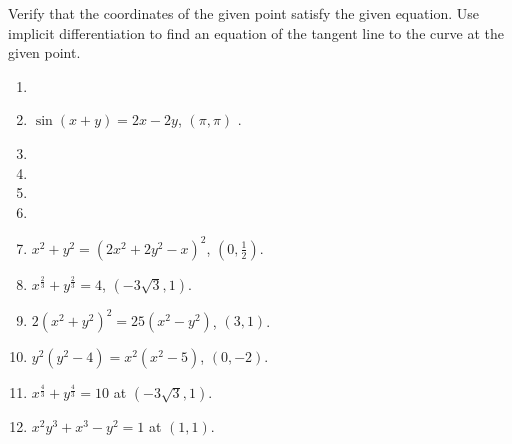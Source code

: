 Verify that the coordinates of the given point satisfy the given equation. Use implicit differentiation to find an equation of the tangent line to the curve at the given point. 
\begin{multicols}{2}
\begin{enumerate}[ref={\fcProblemRef}]
\item 

\item $ \sin (x+y)=2x-2y$, $(\pi,\pi)$ . 

\item 

\item  

\item  
\item  

\item $x^2+y^2=(2x^2+2y^2-x)^2 $, $(0,\frac{1}{2})$. 

\item $x^{\frac{2}{3}}+y^{\frac{2}{3}}=4$, $(-3\sqrt{3},1)$. 

\item $2(x^2+y^2)^2 =25(x^2-y^2)$, $(3,1)$. 

\item $y^2(y^2-4)=x^2(x^2-5) $, $(0,-2)$. 

\item $x^{\frac{4}{3}}+y^{\frac{4}{3}}=10$ at $(-3\sqrt{3}, 1)$. 

\item $x^2y^3+x^3-y^2=1$ at $(1,1)$. 

\end{enumerate}
\end{multicols}
